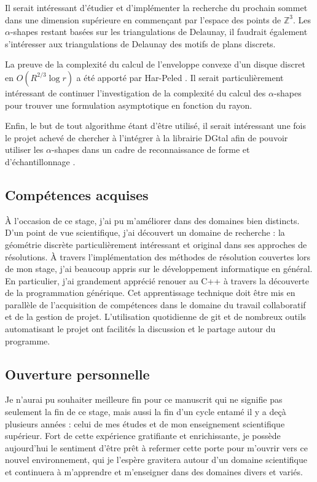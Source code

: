 Il serait intéressant d'étudier et d'implémenter la recherche du prochain sommet dans une dimension supérieure en commençant par l'espace des points de $\mathbb{Z}^{3}$. Les $\alpha$-shapes restant basées sur les triangulations de Delaunay, il faudrait également s'intéresser aux triangulations de Delaunay des motifs de plans discrets.

La preuve de la complexité du calcul de l'enveloppe convexe d'un disque discret en $O(R^{2/3} \log r)$ a été apporté par Har-Peled  \cite{HarPeled98}. Il serait particulièrement intéressant de continuer l'investigation de la complexité du calcul des $\alpha$-shapes pour trouver une formulation asymptotique en fonction du rayon.

Enfin, le but de tout algorithme étant d'être utilisé, il serait intéressant une fois le projet achevé de chercher à l'intégrer à la librairie DGtal afin de pouvoir utiliser les $\alpha$-shapes dans un cadre de reconnaissance de forme et d’échantillonnage \cite{BernardiniB97}.


\subsection{Compétences acquises}

À l'occasion de ce stage, j'ai pu m'améliorer dans des domaines bien distincts. D'un point de vue scientifique, j'ai découvert un domaine de recherche : la géométrie discrète particulièrement intéressant et original dans ses approches de résolutions. À travers l'implémentation des méthodes de résolution couvertes lors de mon stage, j'ai beaucoup appris sur le développement informatique en général. En particulier, j'ai grandement apprécié renouer au C++ à travers la découverte de la programmation générique. Cet apprentissage technique doit être mis en parallèle de l’acquisition de compétences dans le domaine du travail collaboratif et de la gestion de projet. L'utilisation quotidienne de git et de nombreux outils automatisant le projet ont facilités la discussion et le partage autour du programme.

\subsection{Ouverture personnelle}

Je n'aurai pu souhaiter meilleure fin pour ce manuscrit qui ne signifie pas seulement la fin de ce stage, mais aussi la fin d'un cycle entamé il y a deçà plusieurs années : celui de mes études et de mon enseignement scientifique supérieur. Fort de cette expérience gratifiante et enrichissante, je possède aujourd'hui le sentiment d'être prêt à refermer cette porte pour m'ouvrir vers ce nouvel environnement, qui je l'espère gravitera autour d'un domaine scientifique et continuera à m'apprendre et m'enseigner dans des domaines divers et variés.

